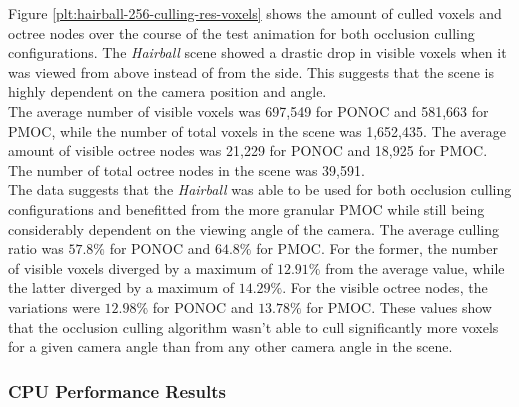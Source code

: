 
\noindent
Figure \ref{plt:hairball-256-culling-res-voxels} shows the amount of culled voxels and octree nodes 
over the course of the test animation for both occlusion culling configurations. The \emph{Hairball} 
scene showed a drastic drop in visible voxels when it was viewed from above instead of from the side. 
This suggests that the scene is highly dependent on the camera position and angle. \\

\noindent
The average number of visible voxels was 697,549 for \ac{PONOC} and 581,663 for \ac{PMOC}, while the 
number of total voxels in the scene was 1,652,435. The average amount of visible octree nodes was 
21,229 for \ac{PONOC} and 18,925 for \ac{PMOC}. The number of total octree nodes in the scene was 
39,591. \\

\noindent
The data suggests that the \emph{Hairball} was able to be used for both occlusion culling configurations 
and benefitted from the more granular \ac{PMOC} while still being considerably dependent on the viewing 
angle of the camera. The average culling ratio was $57.8\%$ for \ac{PONOC} and $64.8\%$ for \ac{PMOC}. 
For the former, the number of visible voxels diverged by a maximum of $12.91\%$ from the average value, 
while the latter diverged by a maximum of $14.29\%$. For the visible octree nodes, the variations were 
$12.98\%$ for \ac{PONOC} and $13.78\%$ for \ac{PMOC}. These values show that the occlusion culling 
algorithm wasn't able to cull significantly more voxels for a given camera angle than from any other 
camera angle in the scene. 

\subsubsection*{CPU Performance Results} \label{subsubsec-cpu-performance-results-hairball}

